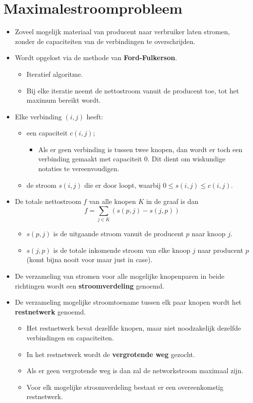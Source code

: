 \section{Maximalestroomprobleem}
\begin{itemize}
    \item Zoveel mogelijk materiaal van producent naar verbruiker laten stromen, zonder de capaciteiten van de verbindingen te overschrijden.
    \item Wordt opgelost via de methode van \textbf{Ford-Fulkerson}. 
    \begin{itemize}
        \item Iteratief algoritme.
        \item Bij elke iteratie neemt de nettostroom vanuit de producent toe, tot het maximum bereikt wordt.
    \end{itemize}
    \item Elke verbinding $(i, j)$ heeft:
    \begin{itemize}
        \item een capaciteit $c(i, j)$;
        \begin{itemize}
            \item  Als er geen verbinding is tussen twee knopen, dan wordt er toch een verbinding gemaakt met capaciteit 0. Dit dient om wiskundige notaties te vereenvoudigen.
        \end{itemize}
        \item de stroom $s(i, j)$ die er door loopt, waarbij $0 \leq s(i, j) \leq c(i, j)$.
        
    \end{itemize}
    \item De totale nettostroom $f$ van alle knopen $K$ in de graaf is dan 
    $$f = \sum_{j \in K} (s(p, j) - s(j, p))$$ 
    \begin{itemize}
        \item $s(p, j)$ is de uitgaande stroom vanuit de producent $p$ naar knoop $j$.
        \item $s(j, p)$ is de totale inkomende stroom van elke knoop $j$ naar producent $p$ (komt bijna nooit voor maar just in case). 
    \end{itemize}
    \item De verzameling van stromen voor alle mogelijke knopenparen in beide richtingen wordt een \textbf{stroomverdeling} genoemd.
    \item De verzameling mogelijke stroomtoename tussen elk paar knopen wordt het \textbf{restnetwerk} genoemd.
    \begin{itemize}
        \item Het restnetwerk bevat dezelfde knopen, maar niet noodzakelijk dezelfde verbindingen en capaciteiten.
        \item In het restnetwerk wordt de \textbf{vergrotende weg} gezocht.
        \item Als er geen vergrotende weg is dan zal de networkstroom maximaal zijn. 
        \item Voor elk mogelijke stroomverdeling bestaat er een overeenkomstig restnetwerk.
    \end{itemize}
\end{itemize}
